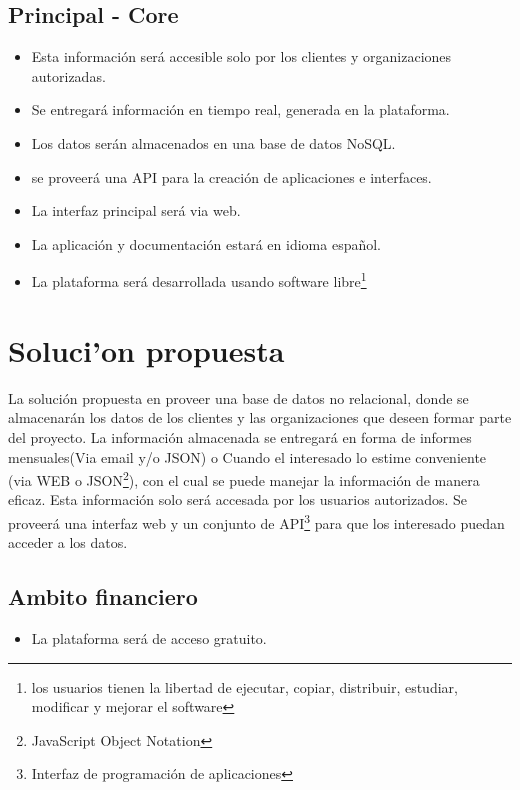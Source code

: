 \documentclass[letterpaper,openright,10pt,oneside]{report}
\begin{document}
			\subsection{Principal - Core}
				\begin{itemize}
					\item Esta información será accesible solo por los clientes y organizaciones autorizadas.
					\item Se entregará información en tiempo real, generada en la plataforma.
					\item Los datos serán almacenados en una base de datos NoSQL.
					\item se proveerá una API para la creación de aplicaciones e interfaces.
					\item La interfaz principal será via web.
					\item La aplicación y documentación estará en idioma español.
					\item La plataforma será desarrollada usando software libre\footnote{los usuarios tienen la libertad de ejecutar, copiar, distribuir, estudiar, modificar y mejorar el software}
				\end{itemize}
		\section{Soluci'on propuesta}
		La solución propuesta en proveer una base de datos no relacional, donde se almacenarán los datos de los clientes y las organizaciones que deseen formar parte del proyecto. La información almacenada se entregará en forma de informes mensuales(Via email y/o JSON) o Cuando el interesado lo estime conveniente (via WEB o JSON\footnote{JavaScript Object Notation}), con el cual se puede manejar la información de manera eficaz. Esta información solo será accesada por los usuarios autorizados. Se proveerá una interfaz web y un conjunto de API\footnote{Interfaz de programación de aplicaciones} para que los interesado puedan acceder a los datos.
			\subsection{Ambito financiero}
				\begin{itemize}
	\item La plataforma será de acceso gratuito.
\end{itemize}
\end{document}
